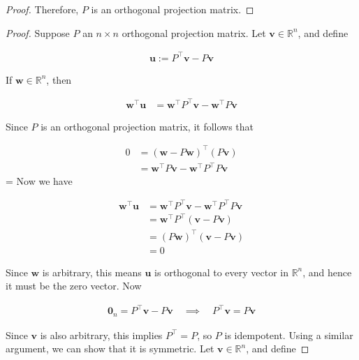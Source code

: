 \documentclass[12pt]{article}
\begin{document}
\begin{enumerate}
\begin{proof}
	Therefore, $P$ is an orthogonal projection matrix.
\end{proof}


\begin{proof}
	Suppose $P$ an $n\times n$ orthogonal projection matrix. Let $\mathbf{v}\in\mathbb{R}^n$,
	and define
	
	\begin{align*}
		\mathbf{u} := P^\top\mathbf{v}-P\mathbf{v}
	\end{align*}
	
	If $\mathbf{w}\in\mathbb{R}^n$, then
	
	\begin{align*}
		\mathbf{w}^\top \mathbf{u}
		&= \mathbf{w}^\top P^\top\mathbf{v}-\mathbf{w}^\top P\mathbf{v}
	\end{align*}
	
	Since $P$ is an orthogonal projection matrix, it follows that
	
	\begin{align*}
		0 &= (\mathbf{w} - P\mathbf{w})^\top(P\mathbf{v})\\
		&=\mathbf{w}^\top P\mathbf{v} - \mathbf{w}^\top P^\top P\mathbf{v}
	\end{align*}
	=
	Now we have
	
	\begin{align*}
		\mathbf{w}^\top \mathbf{u}
		&= \mathbf{w}^\top P^\top\mathbf{v} - \mathbf{w}^\top P^\top P\mathbf{v}\\
		&=\mathbf{w}^\top P^\top(\mathbf{v} - P \mathbf{v})\\
		&=(P\mathbf{w})^\top(\mathbf{v}-P\mathbf{v})\\
		&=0
		\tag{since $P$ is an orthogonal projection matrix}
	\end{align*}
	
	
	Since $\mathbf{w}$ is arbitrary, this means $\mathbf{u}$ is orthogonal
	to every vector in $\mathbb{R}^n$, and hence it must be the zero vector.
	Now
	
	\begin{align*}
		\mathbf{0}_n=P^\top \mathbf{v}-P\mathbf{v} \quad\implies\quad P^\top \mathbf{v}=P\mathbf{v}
	\end{align*}
	
	Since $\mathbf{v}$ is also arbitrary, this implies $P^\top=P$, so $P$ is idempotent.
	Using a similar argument, we can show that it is symmetric. Let $\mathbf{v}\in\mathbb{R}^n$,
	and define
	

\end{proof}
\end{enumerate}
\end{document}
